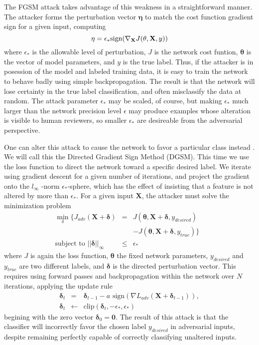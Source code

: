 \documentclass[conference]{IEEEtran}
\begin{document}
The FGSM attack \cite{goodfellow2014explaining} takes advantage of this
weakness in a straightforward manner. The attacker forms the perturbation
vector $\mathbf{\eta }$ to match the cost function gradient sign for a given
input, computing 
\begin{equation*}
\mathbf{\eta }=\epsilon _{\ast }\text{sign}(\nabla _{\mathbf{X}}J(\mathbf{%
\theta },\mathbf{X},y))
\end{equation*}%
where $\epsilon _{\ast }$ is the allowable level of perturbation, $J$ is the
network cost funtion, $\mathbf{\theta }$ is the vector of model parameters,
and $y$ is the true label. Thus, if the attacker is in posession of the
model and labeled training data, it is easy to train the network to behave
badly using simple backpropagation. The result is that the network will lose
certainty in the true label classification, and often misclassify the data
at random. The attack parameter $\epsilon _{\ast }$ may be scaled, of
course, but making $\epsilon _{\ast }$ much larger than the network
precision level $\epsilon $ may produce examples whose alteration is visible
to human reviewers, so smaller $\epsilon _{\ast }$ are desireable from the
adversarial perspective.

One can alter this attack to cause the network to favor a particular class
instead \cite{madry2020adversarial}. We will call this the Directed Gradient
Sign Method (DGSM). This time we use the loss function to direct the network
toward a specific desired label. We iterate using gradient descent for a
given number of iterations, and project the gradient onto the $l_{\infty }$%
-norm $\epsilon _{\ast }$-sphere, which has the effect of insisting that a
feature is not altered by more than $\epsilon _{\ast }$. For a given input $%
\mathbf{X}$, the attacker must solve the minimization problem 
\begin{eqnarray*}
\min_{\delta }\{J_{adv}(\mathbf{X}+\mathbf{\delta }) &=&J(\mathbf{\theta },%
\mathbf{X}+\mathbf{\delta },y_{desired}) \\
&&-J(\mathbf{\theta },\mathbf{X}+\mathbf{\delta },y_{true})\}\text{ } \\
\text{subject to }\left\vert \left\vert \mathbf{\delta }\right\vert
\right\vert _{\infty } &\leq &\epsilon _{\ast }
\end{eqnarray*}%
where $J$ is again the loss function, $\mathbf{\theta }$ the fixed network
parameters, $y_{desired}$ and $y_{true}$ are two different labels, and $%
\mathbf{\delta }$ is the directed perturbation vector. This requires using
forward passes and backpropagation within the network over $N$ iterations,
applying the update rule%
\begin{eqnarray*}
\mathbf{\delta }_{t} &=&\mathbf{\delta }_{t-1}-a\text{ sign}(\nabla L_{adv}(%
\mathbf{X}+\mathbf{\delta }_{t-1})), \\
\mathbf{\delta }_{t} &\leftarrow &\text{clip}(\mathbf{\delta }_{t},-\epsilon
_{\ast },\epsilon _{\ast })
\end{eqnarray*}%
begining with the zero vector $\mathbf{\delta }_{0}=\mathbf{0}$. The result
of this attack is that the classifier will incorrectly favor the chosen
label $y_{desired}$ in adversarial inputs, despite remaining perfectly
capable of correctly classifying unaltered inputs.
\end{document}
